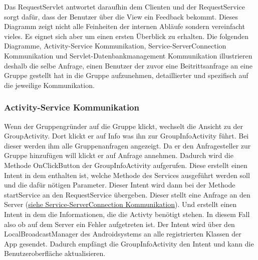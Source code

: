 Das RequestServlet antwortet daraufhin dem Clienten und der RequestService sorgt dafür, dass der Benutzer über die View ein Feedback bekommt. \newline
Dieses Diagramm zeigt nicht alle Feinheiten der internen Abläufe sondern vereinfacht vieles. Es eignet sich aber um einen ersten Überblick zu erhalten.
Die folgenden Diagramme, Activity-Service Kommunikation, Service-ServerConnection Kommunikation und Servlet-Datenbankmanagement Kommunikation illustrieren deshalb die selbe Anfrage, einen Benutzer der zuvor eine Beitrittsanfrage an eine Gruppe gestellt hat in die Gruppe aufzunehmen, detaillierter und spezifisch auf die jeweilige Kommunikation.

\subsubsection{Activity-Service Kommunikation}

\begin {center}
\end {center}
	Wenn der Gruppengründer auf die Gruppe klickt, wechselt die Ansicht zu der GroupActivity. Dort klickt er auf Info was ihn zur GroupInfoActivity führt. Bei dieser werden ihm alle Gruppenanfragen angezeigt. Da er den Anfragesteller zur Gruppe  hinzufügen will klickt er auf Anfrage annehmen. Dadurch wird die Methode OnClickButton der GroupInfoActivity aufgerufen. Diese erstellt einen Intent in dem enthalten ist, welche Methode des Services ausgeführt werden soll und die dafür nötigen Parameter. 
Dieser Intent wird dann bei der Methode startService an den RequestService übergeben. Dieser stellt eine Anfrage an den Server (\hyperlink{ServiceServerConnection}{siehe Service-ServerConnection Kommunikation}). Und erstellt einen Intent in dem die Informationen, die die Activty benötigt stehen. In diesem Fall also ob auf dem Server ein Fehler aufgetreten ist.
Der Intent wird über den LocalBroadcastManager des Androidsystems an alle registrierten Klassen der App gesendet. Dadurch empfängt die GroupInfoActivity den Intent und kann die Benutzeroberfläche aktualisieren.


